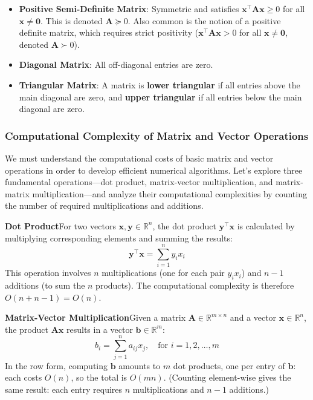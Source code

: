\begin{itemize}
    \item \textbf{Positive Semi-Definite Matrix}: Symmetric and satisfies $ \mathbf{x}^\top \mathbf{A} \mathbf{x} \geq 0 $ for all $ \mathbf{x} \neq \mathbf{0} $. This is denoted $ \mathbf{A} \succeq 0 $. Also common is the notion of a positive definite matrix, which requires strict positivity ($ \mathbf{x}^\top \mathbf{A} \mathbf{x} > 0 $ for all $ \mathbf{x} \neq \mathbf{0} $, denoted $ \mathbf{A} \succ 0 $).
    \item \textbf{Diagonal Matrix}: All off-diagonal entries are zero.
    \item \textbf{Triangular Matrix}: A matrix is \textbf{lower triangular} if all entries above the main diagonal are zero, and \textbf{upper triangular} if all entries below the main diagonal are zero.
\end{itemize}


\subsubsection{Computational Complexity of Matrix and Vector Operations}
\label{sec:complexity-of-matrix-and-vector-operations}
We must understand the computational costs of basic matrix and vector operations in order to develop efficient numerical algorithms. Let's explore three fundamental operations---dot product, matrix-vector multiplication, and matrix-matrix multiplication---and analyze their computational complexities by counting the number of required multiplications and additions.

\textbf{Dot Product}\quad For two vectors $ \mathbf{x}, \mathbf{y} \in \mathbb{R}^n $, the dot product $ \mathbf{y}^\top \mathbf{x} $ is calculated by multiplying corresponding elements and summing the results:
\begin{equation*}
    \mathbf{y}^\top \mathbf{x} = \sum_{i=1}^{n} y_i x_i
\end{equation*}
This operation involves $ n $ multiplications (one for each pair $ y_i x_i $) and $ n - 1 $ additions (to sum the $ n $ products). The computational complexity is therefore $ O(n + n - 1) = O(n) $.

\textbf{Matrix-Vector Multiplication}\quad Given a matrix $ \mathbf{A} \in \mathbb{R}^{m \times n} $ and a vector $ \mathbf{x} \in \mathbb{R}^n $, the product $ \mathbf{A}\mathbf{x} $ results in a vector $ \mathbf{b} \in \mathbb{R}^m $:
\begin{equation*}
    b_i = \sum_{j=1}^{n} a_{ij} x_j, \quad \text{for } i = 1, 2, \dots, m
\end{equation*}
In the row form, computing $\mathbf{b}$ amounts to $m$ dot products, one per entry of $\mathbf{b}$: each costs $O(n)$, so the total is $O(mn)$. (Counting element-wise gives the same result: each entry requires $n$ multiplications and $n-1$ additions.)

